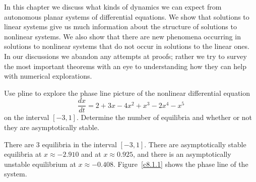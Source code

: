 \documentclass{ximera}
\begin{document}
In this chapter we discuss what kinds of dynamics we can expect
from autonomous planar systems of differential equations.  We 
show that solutions to linear systems give us much 
information about the structure of solutions to nonlinear 
systems.  We also show that there are new phenomena 
occurring in solutions to nonlinear systems that do not occur 
in solutions to the linear ones.  In our discussions we abandon 
any attempts at proofs; rather we try to survey the most 
important theorems with an eye to understanding how they can 
help with numerical explorations.

\EXER

\CEXER

\begin{exercise} \label{c8.1.1}
Use {\sf pline} to explore the phase line 
picture of the nonlinear differential equation
\[
\frac{dx}{dt} = 2 + 3x - 4x^2 + x^3 - 2x^4 -x^5
\]
on the interval $[-3,1]$.  Determine the number of equilibria
and whether or not they are asymptotically stable.

\begin{solution}

There are 3 equilibria in the interval $[-3,1]$.  There are
asymptotically stable equilibria at $x\approx -2.910$ and at 
$x\approx 0.925$, and there is an asymptotically unstable equilibrium at
$x \approx -0.408$.  Figure~\ref{c8.1.1} shows the phase line
of the system.

\begin{figure}[htb]
                       \centerline{%
                       }
\end{figure}

\end{solution}
\end{exercise}
\end{document}
